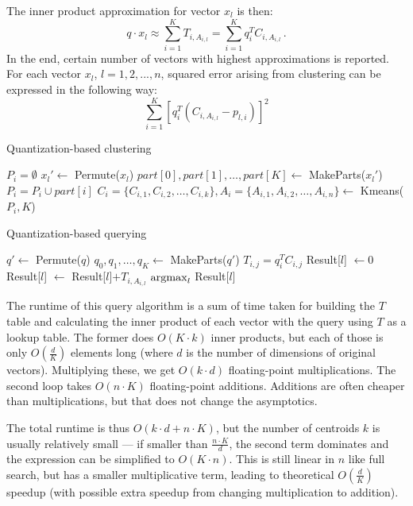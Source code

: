 The inner product approximation for vector $x_l$ is then:
$$q \cdot x_l \approx \sum_{i=1}^{K} T_{i,A_{i,l}} = \sum_{i=1}^{K} q_i^T C_{i,A_{i,l}} \,.$$
In the end, certain number of vectors with highest approximations is reported.
For each vector $x_l$, $l = 1,2,...,n$, squared error arising from clustering can be expressed in the following way:
$$ \sum_{i=1}^{K}  [q_{i}^{T} (C_{i, A_{i,l}} - p_{l,i})]^2$$

\begin{algorithm}
	\caption{Quantization-based clustering}
	\begin{algorithmic}
			\State $P_i = \emptyset$
		\EndFor
			\State $x_l' \gets$ Permute($x_l$)
			\State $part[0], part[1], \dots, part[K] \gets$ MakeParts($x_l'$)
				\State $P_i = P_i \cup part[i]$
			\EndFor
		\EndFor
			\State $C_i = \{C_{i,1}, C_{i,2}, \dots, C_{i,k}\}, A_i = \{A_{i,1}, A_{i,2}, \dots, A_{i,n}\} \gets$ Kmeans($P_i, K$)
		\EndFor
	\end{algorithmic}
\end{algorithm}

\begin{algorithm}
	\caption{Quantization-based querying}
	\begin{algorithmic}
		\State $q' \gets$ Permute($q$)
		\State $q_0, q_1, \dots, q_K \gets$ MakeParts($q'$)
		\For{$i = 0, 1, \dots, K$}
			\For{$j = 0, 1, \dots, k$}
				\State $T_{i,j} = q_i^T C_{i,j}$
			\EndFor
		\EndFor
		\For{$l = 0, 1, \dots, n$}
			\State Result[$l$] $\gets 0$
			\For{$i = 0, 1, \dots, K$}
				\State Result[$l$] $\gets$ Result[$l$]$+ T_{i,A_{i,l}}$
			\EndFor
		\EndFor
		\State \Return $\operatorname*{argmax}_{l}$ Result[$l$]
	\end{algorithmic}
\end{algorithm}

The runtime of this query algorithm is a sum of time taken for building the $T$ table and calculating the inner product of each vector with the query using $T$ as a lookup table.
The former does $O(K \cdot k)$ inner products, but each of those is only $O(\frac{d}{K})$
elements long (where $d$ is the number of dimensions of original vectors). 
Multiplying these, we get $O(k \cdot d)$ floating-point multiplications.
The second loop takes $O(n \cdot K)$ floating-point {additions}. Additions are often
cheaper than multiplications, but that does not change the asymptotics.

The total runtime is thus $O(k \cdot d + n \cdot K)$, but the number of centroids $k$ is usually 
relatively small --- if smaller than $\frac{n \cdot K}{d}$, the second term dominates 
and the expression can be simplified to
$O(K \cdot n)$. This is still linear in $n$ like full search, but has a smaller multiplicative
term, leading to theoretical $O(\frac{d}{K})$ speedup (with possible extra speedup from changing
multiplication to addition). 

